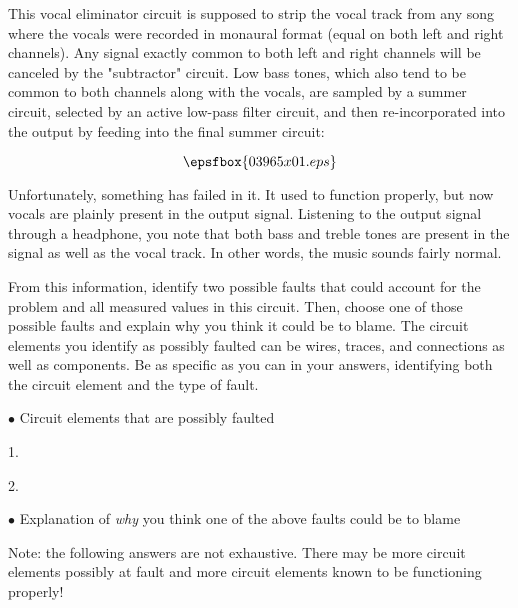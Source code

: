 

This vocal eliminator circuit is supposed to strip the vocal track from any song where the vocals were recorded in monaural format (equal on both left and right channels).  Any signal exactly common to both left and right channels will be canceled by the "subtractor" circuit.  Low bass tones, which also tend to be common to both channels along with the vocals, are sampled by a summer circuit, selected by an active low-pass filter circuit, and then re-incorporated into the output by feeding into the final summer circuit:

$$\epsfbox{03965x01.eps}$$

Unfortunately, something has failed in it.  It used to function properly, but now vocals are plainly present in the output signal.  Listening to the output signal through a headphone, you note that both bass and treble tones are present in the signal as well as the vocal track.  In other words, the music sounds fairly normal.

From this information, identify two possible faults that could account for the problem and all measured values in this circuit.  Then, choose one of those possible faults and explain why you think it could be to blame.  The circuit elements you identify as possibly faulted can be wires, traces, and connections as well as components.  Be as specific as you can in your answers, identifying both the circuit element and the type of fault.

\medskip
\goodbreak
\item{$\bullet$} Circuit elements that are possibly faulted
\item{1.}
\item{2.} 
\medskip

\medskip
\goodbreak
\item{$\bullet$} Explanation of {\it why} you think one of the above faults could be to blame

\vskip 30pt







Note: the following answers are not exhaustive.  There may be more circuit elements possibly at fault and more circuit elements known to be functioning properly!

